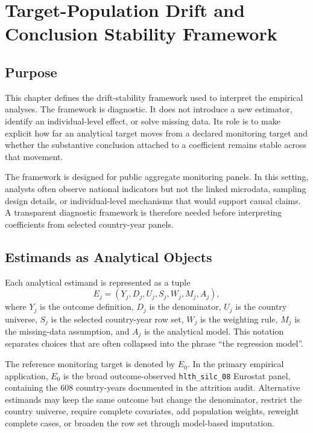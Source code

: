 \chapter{Target-Population Drift and Conclusion Stability Framework}
\label{ch:framework}

\section{Purpose}

This chapter defines the drift-stability framework used to interpret the empirical analyses. The framework is diagnostic. It does not introduce a new estimator, identify an individual-level effect, or solve missing data. Its role is to make explicit how far an analytical target moves from a declared monitoring target and whether the substantive conclusion attached to a coefficient remains stable across that movement.

The framework is designed for public aggregate monitoring panels. In this setting, analysts often observe national indicators but not the linked microdata, sampling design details, or individual-level mechanisms that would support causal claims. A transparent diagnostic framework is therefore needed before interpreting coefficients from selected country-year panels.

\section{Estimands as Analytical Objects}

Each analytical estimand is represented as a tuple
\[
E_j = (Y_j, D_j, U_j, S_j, W_j, M_j, A_j),
\]
where \(Y_j\) is the outcome definition, \(D_j\) is the denominator, \(U_j\) is the country universe, \(S_j\) is the selected country-year row set, \(W_j\) is the weighting rule, \(M_j\) is the missing-data assumption, and \(A_j\) is the analytical model. This notation separates choices that are often collapsed into the phrase ``the regression model''.

The reference monitoring target is denoted by \(E_0\). In the primary empirical application, \(E_0\) is the broad outcome-observed \texttt{hlth\_silc\_08} Eurostat panel, containing the 608 country-years documented in the attrition audit. Alternative estimands may keep the same outcome but change the denominator, restrict the country universe, require complete covariates, add population weights, reweight complete cases, or broaden the row set through model-based imputation.


